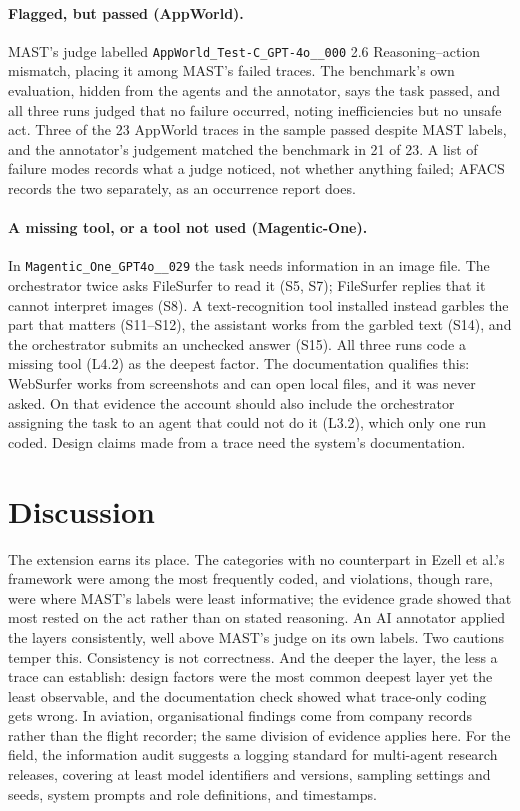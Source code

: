\documentclass[10pt,a4paper]{article}
\newcommand{\code}[1]{\texttt{#1}}
\begin{document}
\paragraph{Flagged, but passed (AppWorld).} MAST's judge labelled
\code{AppWorld\_Test-C\_GPT-4o\_\_000} 2.6 Reasoning--action mismatch, placing it
among MAST's failed traces. The benchmark's own evaluation, hidden from the agents
and the annotator, says the task passed, and all three runs judged that no failure
occurred, noting inefficiencies but no unsafe act. Three of the 23 AppWorld traces
in the sample passed despite MAST labels, and the annotator's judgement matched the
benchmark in 21 of 23. A list of failure modes records what a judge noticed, not
whether anything failed; AFACS records the two separately, as an occurrence report
does.

\paragraph{A missing tool, or a tool not used (Magentic-One).} In
\code{Magentic\_One\_GPT4o\_\_029} the task needs information in an image file. The
orchestrator twice asks FileSurfer to read it (S5, S7); FileSurfer replies that it
cannot interpret images (S8). A text-recognition tool installed instead garbles the
part that matters (S11--S12), the assistant works from the garbled text (S14), and
the orchestrator submits an unchecked answer (S15). All three runs code a missing
tool (L4.2) as the deepest factor. The documentation qualifies this: WebSurfer
works from screenshots and can open local files, and it was never asked. On that
evidence the account should also include the orchestrator assigning the task to an
agent that could not do it (L3.2), which only one run coded. Design claims made
from a trace need the system's documentation.

\section{Discussion}

The extension earns its place. The categories with no counterpart in Ezell et
al.'s framework were among the most frequently coded, and violations, though rare,
were where MAST's labels were least informative; the evidence grade showed that
most rested on the act rather than on stated reasoning. An AI annotator applied
the layers consistently, well above MAST's judge on its own labels. Two cautions
temper this. Consistency is not correctness. And the deeper the layer, the less a
trace can establish: design factors were the most common deepest layer yet the
least observable, and the documentation check showed what trace-only coding gets
wrong. In aviation, organisational findings come from company records rather than
the flight recorder; the same division of evidence applies here. For the field,
the information audit suggests a logging standard for multi-agent research
releases, covering at least model identifiers and versions, sampling settings and
seeds, system prompts and role definitions, and timestamps.
\end{document}
